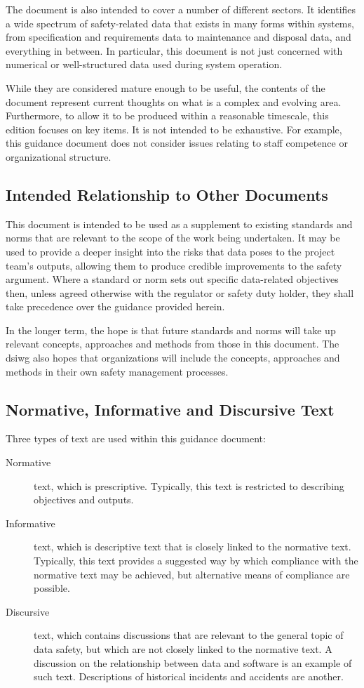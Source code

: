 The document is also intended to cover a number of different sectors. It identifies a wide spectrum of safety-related data that exists in many forms within systems, from specification and requirements data to maintenance and disposal data, and everything in between. In particular, this document is not just concerned with numerical or well-structured data used during system operation.

While they are considered mature enough to be useful, the contents of the document represent current thoughts on what is a complex and evolving area. Furthermore, to allow it to be produced within a reasonable timescale, this edition focuses on key items. It is not intended to be exhaustive. For example, this guidance document does not consider issues relating to staff competence or organizational structure.

\subsection{Intended Relationship to Other Documents}
This document is intended to be used as a supplement to existing standards and norms that are relevant to the scope of the work being undertaken. It may be used to provide a deeper insight into the risks that data poses to the project team's outputs, allowing them to produce credible improvements to the safety argument. Where a standard or norm sets out specific data-related objectives then, unless agreed otherwise with the regulator or safety duty holder, they shall take precedence over the guidance provided herein.

In the longer term, the hope is that future standards and norms will take up relevant concepts, approaches and methods from those in this document. The \gls{dsiwg} also hopes that organizations will include the concepts, approaches and methods in their own safety management processes.

\clearpage %
\subsection{Normative, Informative and Discursive Text}
Three types of text are used within this guidance document:
\begin{description}
	\item[Normative] text, which is prescriptive. Typically, this text is restricted to describing objectives and outputs.
	\item[Informative] text, which is descriptive text that is closely linked to the normative text. Typically, this text provides a suggested way by which compliance with the normative text may be achieved, but alternative means of compliance are possible.
	\item[Discursive] text, which contains discussions that are relevant to the general topic of data safety, but which are not closely linked to the normative text. A discussion on the relationship between data and software is an example of such text. Descriptions of historical incidents and accidents are another.
\end{description}

